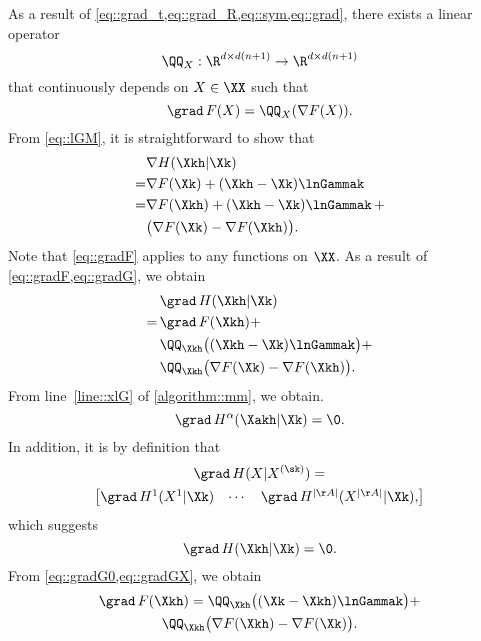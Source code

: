 As a result of \cref{eq::grad_t,eq::grad_R,eq::sym,eq::grad}, there exists a linear operator
\begin{equation}\label{eq::QQx}
	\QQ_X:\R^{d\times d(n+1)}\rightarrow \R^{d\times d(n+1)}
\end{equation} 
that continuously depends on $X\in \XX$ such that
\begin{equation}\label{eq::gradF}
	\grad\, F(X)=\QQ_X(\nabla F(X)).
\end{equation}
From \cref{eq::lGM}, it is straightforward to show that
\begin{equation}\label{eq::gradG}
	\begin{aligned}
	&\nabla H(\Xkh|\Xk)\\
	=&\nabla F(\Xk)+(\Xkh-\Xk)\lnGammak\\
	=&\nabla F(\Xkh)+(\Xkh-\Xk)\lnGammak\, +\\
	 &\big(\nabla F(\Xk) -\nabla F(\Xkh)\big).
	\end{aligned}
\end{equation}
Note that \cref{eq::gradF} applies to any functions on $\XX$. As a result of \cref{eq::gradF,eq::gradG}, we obtain 
\begin{equation}\label{eq::gradGX}
\begin{aligned}
&\grad\,H(\Xkh|\Xk)\\
=\,&\grad\, F(\Xkh) +\\
& \QQ_{\Xkh}\big((\Xkh-\Xk)\lnGammak\big)+\\
 &\QQ_{\Xkh}\big(\nabla F(\Xk)-\nabla F(\Xkh)\big).
\end{aligned}
\end{equation}
From line~\ref{line::xlG} of \cref{algorithm::mm}, we obtain. 
$$\grad\, H^\alpha(\Xakh|\Xk)=\0.$$
In addition, it is by definition that
\begin{multline}
	\nonumber
	\grad\, H(X|X^{(\sk)})=\\
	\begin{bmatrix}
		\grad\, H^1(X^1|\Xk) & \cdots & \grad\, H^{|\AA|}(X^{|\AA|}|\Xk),
	\end{bmatrix}
\end{multline}
which suggests
\begin{equation}\label{eq::gradG0}
	\grad\,H(\Xkh|\Xk)=\0.
\end{equation}
From \cref{eq::gradG0,eq::gradGX}, we obtain
\begin{multline}
	\nonumber
	\grad\, F(\Xkh)=\QQ_{\Xkh}\big((\Xk-\Xkh)\lnGammak\big)+\\
	\QQ_{\Xkh}\big(\nabla F(\Xkh)-\nabla F(\Xk)\big).
\end{multline}
